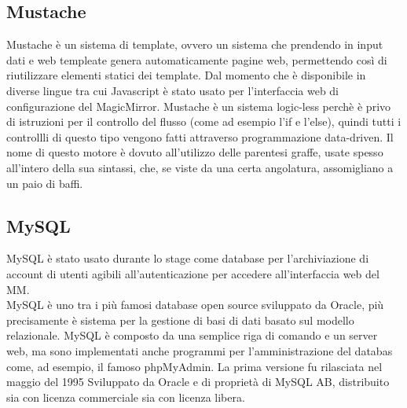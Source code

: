 \subsection{Mustache}\label{cap:mustace}
Mustache \`e un sistema di template, ovvero un sistema che prendendo in input dati e web templeate
genera automaticamente pagine web, permettendo così di riutilizzare elementi statici dei template.
Dal momento che è disponibile in diverse lingue tra cui Javascript \`e stato usato per l'interfaccia web di configurazione
del MagicMirror.
Mustache \`e un sistema logic-less perch\`e \`e privo di istruzioni per il controllo del flusso
(come ad esempio l'if e l'else), quindi tutti i controllli di questo tipo vengono fatti
attraverso programmazione data-driven.
Il nome di questo motore \`e dovuto all'utilizzo delle parentesi graffe, usate spesso
all'intero della sua sintassi, che, se viste da una certa angolatura, assomigliano
a un paio di baffi.

\subsection{MySQL}
MySQL \`e stato usato durante lo stage come database per l'archiviazione di account di utenti
agibili all'autenticazione per accedere all'interfaccia web del MM.\\
MySQL \`e uno tra i pi\`u famosi database open source sviluppato da Oracle, pi\`u precisamente
\`e sistema per la gestione di basi di dati basato sul modello relazionale.
MySQL \`e composto da una semplice riga di comando e un server web, ma sono implementati anche programmi
per l'amministrazione del databas come, ad esempio, il famoso phpMyAdmin.
La prima versione fu rilasciata nel maggio del 1995 Sviluppato da Oracle e di propriet\`a di MySQL AB,
distribuito sia con licenza commerciale sia con licenza libera.

